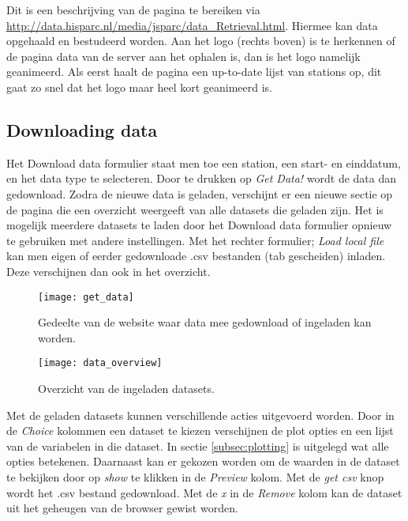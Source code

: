 Dit is een beschrijving van de pagina te bereiken via
\url{http://data.hisparc.nl/media/jsparc/data_Retrieval.html}. Hiermee
kan data opgehaald en bestudeerd worden. Aan het \hisparc logo (rechts
boven) is te herkennen of de pagina data van de \hisparc server aan het
ophalen is, dan is het logo namelijk geanimeerd. Als eerst haalt de
pagina een up-to-date lijst van \hisparc stations op, dit gaat zo snel
dat het logo maar heel kort geanimeerd is.


\subsection{Downloading data}

Het Download data formulier staat men toe een \hisparc station, een
start- en einddatum, en het data type te selecteren. Door te drukken op
\emph{Get Data!} wordt de data dan gedownload. Zodra de nieuwe data is
geladen, verschijnt er een nieuwe sectie op de pagina die een overzicht
weergeeft van alle datasets die geladen zijn. Het is mogelijk meerdere
datasets te laden door het Download data formulier opnieuw te gebruiken
met andere instellingen. Met het rechter formulier; \emph{Load local
file} kan men eigen of eerder gedownloade .csv bestanden (tab
gescheiden) inladen. Deze verschijnen dan ook in het overzicht.

\begin{figure}
    \centering
    \texttt{[image: get\_data]}
    \caption{Gedeelte van de website waar data mee gedownload of
             ingeladen kan worden.}
    \label{fig:get_data}
\end{figure}

\begin{figure}
    \centering
    \texttt{[image: data\_overview]}
    \caption{Overzicht van de ingeladen datasets.}
    \label{fig:get_data}
\end{figure}

Met de geladen datasets kunnen verschillende acties uitgevoerd worden.
Door in de \emph{Choice} kolommen een dataset te kiezen verschijnen de
plot opties en een lijst van de variabelen in die dataset. In sectie
\ref{subsec:plotting} is uitgelegd wat alle opties betekenen. Daarnaast
kan er gekozen worden om de waarden in de dataset te bekijken door op
\emph{show} te klikken in de \emph{Preview} kolom. Met de \emph{get csv}
knop wordt het .csv bestand gedownload. Met de \emph{x} in de
\emph{Remove} kolom kan de dataset uit het geheugen van de browser
gewist worden.


